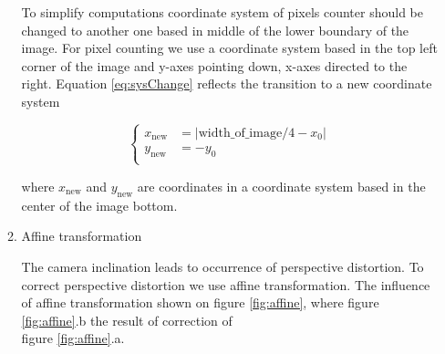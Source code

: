 \documentclass[a4paper,12pt]{article} %
\begin{document}
\begin{enumerate}
\begin{enumerate}
		To simplify computations coordinate system of pixels counter should be changed to another one based in middle of the lower boundary of the image. For pixel counting we use a coordinate system based in the top left corner of the image and y-axes pointing down, x-axes directed to the right. Equation \eqref{eq:sysChange} reflects the transition to a new coordinate system
	
		\begin{equation}
			\left\{
				\begin{aligned}
					x_{\text{new}} &= | \text{width\_of\_image} / 4 - x_0 | \\
					y_{\text{new}} &= -y_0\\
				\end{aligned}
			\right.
		\label{eq:sysChange}
		\end{equation}
	
	\begin{flushright}
		\footnotesize where $x_{\text{new}}$ and $y_{\text{new}}$ are coordinates in a coordinate system based in the center of the image bottom.
	\end{flushright}
	


	\newpage
		\item Affine transformation
		
		The camera inclination leads to occurrence of perspective distortion. To correct perspective distortion we use affine transformation. The influence of affine transformation shown on figure \ref{fig:affine}, where figure  \ref{fig:affine}.b the result of correction of \\figure \ref{fig:affine}.a.
		

\end{enumerate}
\end{enumerate}
\end{document}
